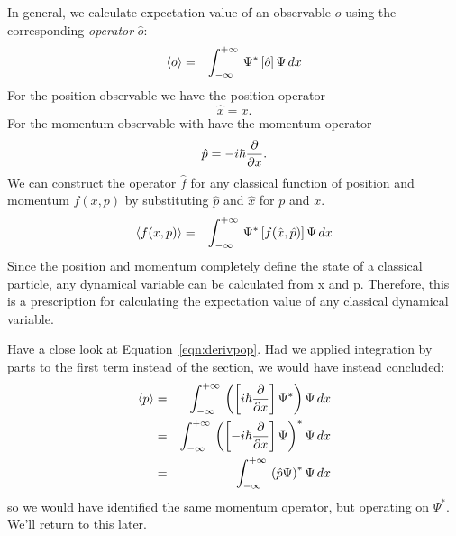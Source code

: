 \documentclass[12pt]{book}
\begin{document}
In general, we calculate expectation value of an observable $o$
using the corresponding {\em operator} $\hat{o}$:
\begin{eqnarray}
\braket{o}  &=& \int_{-\infty}^{+\infty} \, \Psi^* \left[ \hat{o} \right] \Psi \,dx 
\end{eqnarray}
For the position observable we have the position operator 
\begin{equation}
\hat{x} = x.
\end{equation}
For the momentum observable with have the momentum operator 
\begin{equation}
\hat{p} = - i \hbar \frac{\partial}{\partial x}.
\end{equation}
We can construct the operator $\hat{f}$ for any classical function of position and momentum $f(x,p)$ by substituting $\hat{p}$ and $\hat{x}$ for $p$ and $x$.
\begin{eqnarray}
\braket{f(x,p)}  &=& \int_{-\infty}^{+\infty} \, \Psi^* \left[ f(\hat{x},\hat{p}) \right] \Psi \,dx 
\end{eqnarray}
Since the position and momentum completely define the state of a classical particle, any dynamical variable can be calculated from x and p.  Therefore, this is a prescription for calculating the expectation value of any classical dynamical variable.

Have a close look at Equation~\ref{eqn:derivpop}.  Had we applied integration by parts to the first term instead of the section, we would have instead concluded:
\begin{eqnarray*}
\braket{p} &=&  
\int_{-\infty}^{+\infty} \, \left(\left[ i \hbar \frac{\partial}{\partial x}\right] \Psi^* \right) \Psi\,dx \\
&=& \int_{-\infty}^{+\infty} \, \left(\left[ -i \hbar \frac{\partial}{\partial x}\right] \Psi \right)^* \Psi\,dx \\
&=& \int_{-\infty}^{+\infty} \, \left( \hat{p} \Psi \right)^* \Psi\,dx 
\end{eqnarray*}
so we would have identified the same momentum operator, but operating on $\Psi^*$.  We'll return to this later.
\end{document}
